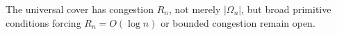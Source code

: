 The universal cover has congestion \(R_n\), not merely \(|\Omega_n|\), but broad primitive conditions forcing \(R_n=O(\log n)\) or bounded congestion remain open.